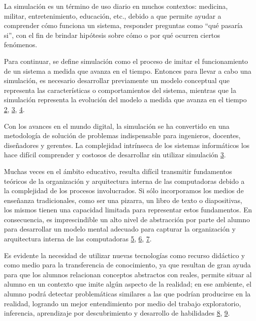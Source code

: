 \documentclass[12pt,twoside]{templates/unerthesis}
\begin{document}
La simulación es un término de uso diario en muchos contextos: medicina, militar, entretenimiento, educación, etc., debido a que permite ayudar a comprender cómo funciona un sistema, responder preguntas como ``qué pasaría si'', con el fin de brindar hipótesis sobre cómo o por qué ocurren ciertos fenómenos.

Para continuar, se define simulación como el proceso de imitar el funcionamiento de un sistema a medida que avanza en el tiempo. Entonces para llevar a cabo una simulación, es necesario desarrollar previamente un modelo conceptual que representa las características o comportamientos del sistema, mientras que la simulación representa la evolución del modelo a medida que avanza en el tiempo \protect\hyperlink{ref-banks_discrete-event_2010}{2}, \protect\hyperlink{ref-law_simulation_2015}{3}, \protect\hyperlink{ref-robinson_simulation_2014}{4}.

Con los avances en el mundo digital, la simulación se ha convertido en una metodología de solución de problemas indispensable para ingenieros, docentes, diseñadores y gerentes. La complejidad intrínseca de los sistemas informáticos los hace difícil comprender y costosos de desarrollar sin utilizar simulación \protect\hyperlink{ref-law_simulation_2015}{3}.

Muchas veces en el ámbito educativo, resulta difícil transmitir fundamentos teóricos de la organización y arquitectura interna de las computadoras debido a la complejidad de los procesos involucrados. Si sólo incorporamos los medios de enseñanza tradicionales, como ser una pizarra, un libro de texto o diapositivas, los mismos tienen una capacidad limitada para representar estos fundamentos. En consecuencia, es imprescindible un alto nivel de abstracción por parte del alumno para desarrollar un modelo mental adecuado para capturar la organización y arquitectura interna de las computadoras \protect\hyperlink{ref-lion_simuladores_2005}{5}, \protect\hyperlink{ref-contreras_uso_2010}{6}, \protect\hyperlink{ref-garcia-garcia_pbbcache_2020}{7}.

Es evidente la necesidad de utilizar nuevas tecnologías como recurso didáctico y como medio para la transferencia de conocimiento, ya que resultan de gran ayuda para que los alumnos relacionan conceptos abstractos con reales, permite situar al alumno en un contexto que imite algún aspecto de la realidad; en ese ambiente, el alumno podrá detectar problemáticas similares a las que podrían producirse en la realidad, logrando un mejor entendimiento por medio del trabajo exploratorio, inferencia, aprendizaje por descubrimiento y desarrollo de habilidades \protect\hyperlink{ref-nova_tool_2013}{8}, \protect\hyperlink{ref-mustafa_evaluating_2010}{9}.
\end{document}
